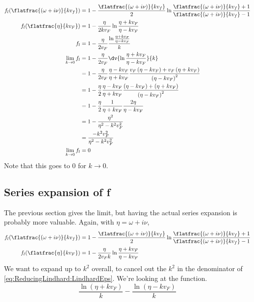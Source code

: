 \documentclass[../../main.tex]{subfiles}
\newcommand{\vf}{v_F}
\begin{document}
\begin{align}
	f_l(\flatfrac{(\omega + i \nu)}{k v_f}) &= 1 - \frac{\flatfrac{(\omega + i \nu)}{k v_f}}{2} \ln\frac{\flatfrac{(\omega + i \nu)}{k v_f} + 1}{\flatfrac{(\omega + i \nu)}{k v_f} - 1} \\
	f_l(\flatfrac{\eta}{k \vf}) &= 1 - \frac{\eta}{2 k \vf} \ln\frac{\eta + k \vf}{\eta - k\vf} \\
	f_l &=  1 - \frac{\eta}{2 \vf} \frac{\ln\frac{\eta + k \vf}{\eta - k\vf}}{k} \\ 
	\lim_{k \to 0} f_l &= 1 - \frac{\eta}{2 \vf} \dv{\ln\frac{\eta + k \vf}{\eta - k\vf}}{k} \\
	&= 1 - \frac{\eta}{2 \vf} \frac{\eta - k \vf}{\eta + k\vf} \frac{\vf \left(\eta - k\vf \right)+ \vf \left(\eta + k \vf \right)}{\left( \eta - k \vf \right)^2} \\
	&= 1 - \frac{\eta}{2 } \frac{\eta - k \vf}{\eta + k\vf} \frac{\left(\eta - k\vf \right)+  \left(\eta + k \vf \right)}{\left( \eta - k \vf \right)^2} \\
	&= 1 - \frac{\eta}{2 } \frac{1}{\eta + k\vf} \frac{2 \eta}{\eta - k \vf } \\
	&= 1 - \frac{\eta^2}{\eta^2 - k^2 \vf^2} \\
	&= \frac{-k^2 \vf^2}{\eta^2 - k^2 \vf^2} \\
	\lim_{k \to 0} f_l &= 0
\end{align}
Note that this goes to $0$ for $k \to 0$.

\subsection{Series expansion of f}
The previous section gives the limit, but having the actual series expansion is probably more valuable. Again, with $\eta = \omega + i \nu$,
\begin{align}
	f_l(\flatfrac{(\omega + i \nu)}{k v_f}) &= 1 - \frac{\flatfrac{(\omega + i \nu)}{k v_f}}{2} \ln\frac{\flatfrac{(\omega + i \nu)}{k v_f} + 1}{\flatfrac{(\omega + i \nu)}{k v_f} - 1} \\
	f_l(\flatfrac{\eta}{k \vf}) &= 1 - \frac{\eta}{2 \vf k} \ln\frac{\eta + k \vf}{\eta - k\vf} \label{eq:ReducingLindhard:simplef}
\end{align}
We want to expand up to $k^2$ overall, to cancel out the $k^2$ in the denominator of \eqref{eq:ReducingLindhard:LindhardEps}. We're looking at the function. 
\begin{equation}
	\frac{\ln(\eta + k \vf)}{k} - \frac{\ln(\eta - k \vf)}{k} 
\end{equation}
\end{document}
